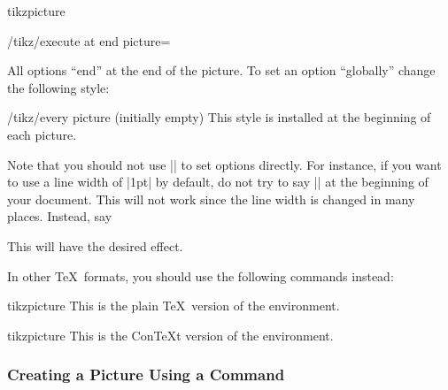 \begin{environment}{{tikzpicture}}
\begin{key}{/tikz/execute at end picture=}
\begin{codeexample}[]
\end{codeexample}
  \end{key}

  All options ``end'' at the end of the picture. To set an option
  ``globally'' change the following style:
  \begin{stylekey}{/tikz/every picture (initially \normalfont empty)}
    This style is installed at the beginning of each picture.
\begin{codeexample}
\tikzset{every picture/.style=semithick}
\end{codeexample}
  \end{stylekey}

  Note that you should not use |\tikzset| to set options directly. For
  instance, if you want to use a line width of |1pt| by default, do
  not try to say |\tikzset{line width=1pt}| at the beginning of your
  document. This will not work since the line width is changed in many
  places. Instead, say
\begin{codeexample}
\end{codeexample}
  This will have the desired effect.
\end{environment}

In other \TeX\ formats, you should use the following commands instead:

\begin{plainenvironment}{{tikzpicture}}
  This is the plain \TeX\ version of the environment.
\end{plainenvironment}

\begin{contextenvironment}{{tikzpicture}}
  This is the Con\TeX t version of the environment.
\end{contextenvironment}


\subsubsection{Creating a Picture Using a Command}

